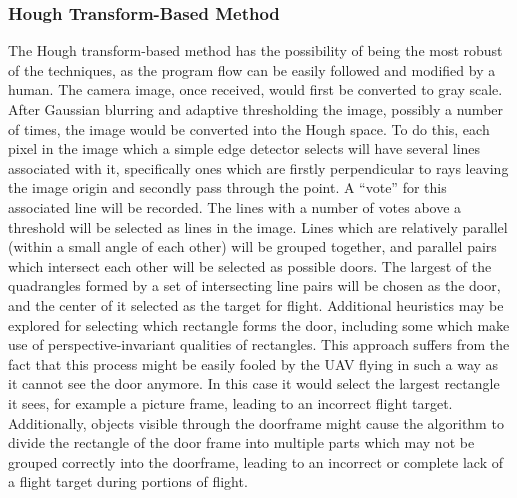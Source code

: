 \documentclass[12pt]{article}
\begin{document}
\subsubsection{Hough Transform-Based Method}
The Hough transform-based method has the possibility of being the most robust of the techniques, as the program flow can be easily followed and modified by a human. The camera image, once received, would first be converted to gray scale. After Gaussian blurring and adaptive thresholding the image, possibly a number of times, the image would be converted into the Hough space. To do this, each pixel in the image which a simple edge detector selects will have several lines associated with it, specifically ones which are firstly perpendicular to rays leaving the image origin and secondly pass through the point. A ``vote'' for this associated line will be recorded. The lines with a number of votes above a threshold will be selected as lines in the image. Lines which are relatively parallel (within a small angle of each other) will be grouped together, and parallel pairs which intersect each other will be selected as possible doors. The largest of the quadrangles formed by a set of intersecting line pairs will be chosen as the door, and the center of it selected as the target for flight. Additional heuristics may be explored for selecting which rectangle forms the door, including some which make use of perspective-invariant qualities of rectangles. This approach suffers from the fact that this process might be easily fooled by the UAV flying in such a way as it cannot see the door anymore. In this case it would select the largest rectangle it sees, for example a picture frame, leading to an incorrect flight target. Additionally, objects visible through the doorframe might cause the algorithm to divide the rectangle of the door frame into multiple parts which may not be grouped correctly into the doorframe, leading to an incorrect or complete lack of a flight target during portions of flight. 
\end{document}
